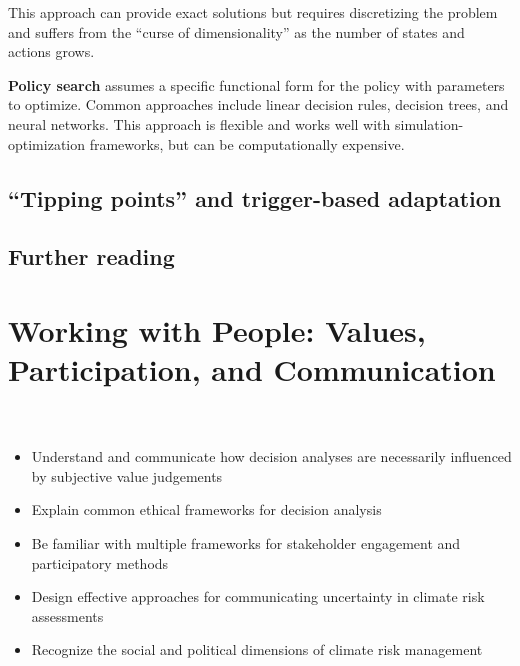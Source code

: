 \documentclass[
  letterpaper,
  DIV=11,
  numbers=noendperiod]{scrreprt}
\providecommand{\tightlist}{%
  \setlength{\itemsep}{0pt}\setlength{\parskip}{0pt}}
\begin{document}
This approach can provide exact solutions but requires discretizing the
problem and suffers from the ``curse of dimensionality'' as the number
of states and actions grows.

\textbf{Policy search} assumes a specific functional form for the policy
with parameters to optimize. Common approaches include linear decision
rules, decision trees, and neural networks. This approach is flexible
and works well with simulation-optimization frameworks, but can be
computationally expensive.

\section{``Tipping points'' and trigger-based
adaptation}\label{tipping-points-and-trigger-based-adaptation}

\section*{Further reading}\label{further-reading-19}


\chapter{Working with People: Values, Participation, and Communication
🚧}\label{working-with-people-values-participation-and-communication}

\begin{tcolorbox}[enhanced jigsaw, arc=.35mm, breakable, title=\textcolor{quarto-callout-tip-color}{\faLightbulb}\hspace{0.5em}{Learning objectives}, coltitle=black, opacityback=0, bottomtitle=1mm, colback=white, left=2mm, opacitybacktitle=0.6, toptitle=1mm, colframe=quarto-callout-tip-color-frame, leftrule=.75mm, titlerule=0mm, rightrule=.15mm, bottomrule=.15mm, colbacktitle=quarto-callout-tip-color!10!white, toprule=.15mm]

\begin{itemize}
\tightlist
\item
  Understand and communicate how decision analyses are necessarily
  influenced by subjective value judgements
\item
  Explain common ethical frameworks for decision analysis
\item
  Be familiar with multiple frameworks for stakeholder engagement and
  participatory methods
\item
  Design effective approaches for communicating uncertainty in climate
  risk assessments
\item
  Recognize the social and political dimensions of climate risk
  management
\end{itemize}

\end{tcolorbox}
\end{document}
